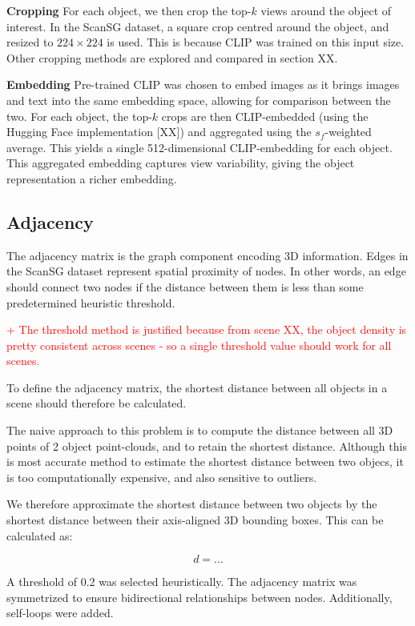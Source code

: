 \bigskip
\noindent
\textbf{Cropping}
For each object, we then crop the top-$k$ views around the object of interest. In the ScanSG dataset, a square crop centred around the object, and resized to $224 \times 224$ is used. This is because CLIP was trained on this input size. Other cropping methods are explored and compared in section XX.

\bigskip
\noindent
\textbf{Embedding}
Pre-trained CLIP was chosen to embed images as it brings images and text into the same embedding space, allowing for comparison between the two.
For each object, the top-$k$ crops are then CLIP-embedded (using the Hugging Face implementation [XX]) and aggregated using the $s_f$-weighted average. This yields a single 512-dimensional CLIP-embedding for each object.
This aggregated embedding captures view variability, giving the object representation a richer embedding.

\subsection{Adjacency}
The adjacency matrix is the graph component encoding 3D information. Edges in the ScanSG dataset represent spatial proximity of nodes. In other words, an edge should connect two nodes if the distance between them is less than some predetermined heuristic threshold.

\textcolor{red}{+ The threshold method is justified because from scene XX, the object density is pretty consistent across scenes - so a single threshold value should work for all scenes.}

To define the adjacency matrix, the shortest distance between all objects in a scene should therefore be calculated.

The naive approach to this problem is to compute the distance between all 3D points of 2 object point-clouds, and to retain the shortest distance. Although this is most accurate method to estimate the shortest distance between two objecs, it is too computationally expensive, and also sensitive to outliers.

We therefore approximate the shortest distance between two objects by the shortest distance between their axis-aligned 3D bounding boxes. This can be calculated as:

\begin{equation*}
    d = ...
\end{equation*}

A threshold of 0.2 was selected heuristically. The adjacency matrix was symmetrized to ensure bidirectional relationships between nodes. Additionally, self-loops were added.


